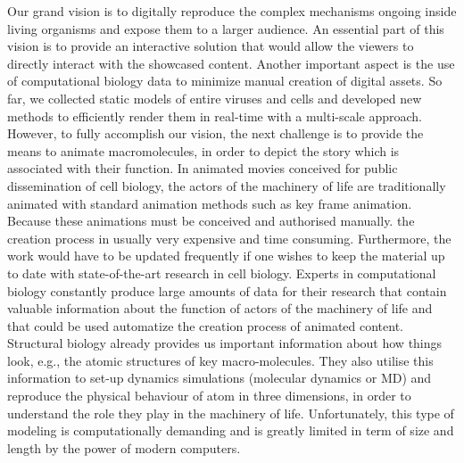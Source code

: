 Our grand vision is to digitally reproduce the complex mechanisms ongoing inside living organisms and expose them to a larger audience.
An essential part of this vision is to provide an interactive solution that would allow the viewers to directly interact with the showcased content.
Another important aspect is the use of computational biology data to minimize manual creation of digital assets. 
So far, we collected static models of entire viruses and cells and developed new methods to efficiently render them in real-time with a multi-scale approach.
However, to fully accomplish our vision, the next challenge is to provide the means to animate macromolecules, in order to depict the story which is associated with their function.
In animated movies conceived for public dissemination of cell biology, the actors of the machinery of life are traditionally animated with standard animation methods such as key frame animation.
Because these animations must be conceived and authorised manually. the creation process in usually very expensive and time consuming.
Furthermore, the work would have to be updated frequently if one wishes to keep the material up to date with state-of-the-art research in cell biology.
Experts in computational biology constantly produce large amounts of data for their research that contain valuable information about the function of actors of the machinery of life and that could be used automatize the creation process of animated content.
Structural biology already provides us important information about how things look, e.g., the atomic structures of key macro-molecules.
They also utilise this information to set-up dynamics simulations (molecular dynamics or MD) and reproduce the physical behaviour of atom in three dimensions, in order to understand the role they play in the machinery of life.
Unfortunately, this type of modeling is computationally demanding and is greatly limited in term of size and length by the power of modern computers.

